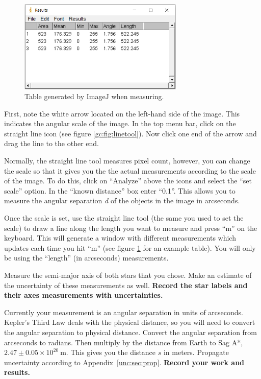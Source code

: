 \begin{figure}
	\centering
	\includegraphics[width=0.7\textwidth]{galactic-center/measurement_table.png}
	\caption {Table generated by ImageJ when measuring.}
	\label{gc:fig:measurement}
\end{figure}

\begin{steps}
	\item First, note the white arrow located on the left-hand side of the image. This indicates the angular scale of the image. In the top menu bar, click on the straight line icon (see  figure \ref{gc:fig:linetool}). Now click one end of the arrow and drag the line to the other end.
	
	\item Normally, the straight line tool measures pixel count, however, you can change the scale so that it gives you the the actual measurements according to the scale of the image. To do this, click on ``Analyze'' above the icons and select the ``set scale'' option. In the ``known distance'' box enter ``0.1''. This allows you to measure the angular separation \textit{d} of the objects in the image in arcseconds. 
	
	\item Once the scale is set, use the straight line tool (the same you used to set the scale) to draw a line along the length you want to measure and press ``m'' on the keyboard. This will generate a window with different measurements which updates each time you hit ``m'' (see figure \ref{gc:fig:measurement} for an example table). You will only be using the ``length'' (in arcseconds) measurements.%
	
	\item Measure the semi-major axis of both stars that you chose. Make an estimate of the uncertainty of these measurements as well. \textbf{Record the star labels and their axes measurements with uncertainties.}
	
	\item\label{gc:step:angle-to-distance} Currently your measurement is an angular separation in units of arcseconds. Kepler's Third Law deals with the physical distance, so you will need to convert the angular separation to physical distance. Convert the angular separation from arcseconds to radians. Then multiply by the distance from Earth to Sag A*, $2.47 \pm 0.05 \times 10^{20}\:$m. This gives you the distance $s$ in meters. Propagate uncertainty according to Appendix\ \ref{unc:sec:prop}. \textbf{Record your work and results.}
	

\end{steps}
